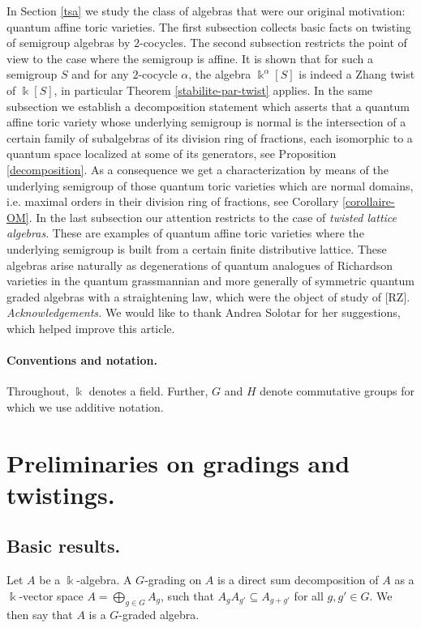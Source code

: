 \documentclass[twoside,11pt]{article}
\renewcommand{\k}{\Bbbk}
\begin{document}
In Section \ref{tsa} we study the class of algebras that were our original motivation:
quantum affine toric varieties. The first subsection collects basic
facts on twisting of semigroup algebras by $2$-cocycles. The second subsection restricts
the point of view to the case where the semigroup is affine. It is shown  that for such a
semigroup $S$ and for any $2$-cocycle $\alpha$, the algebra $\k^\alpha[S]$ is indeed a
Zhang twist of $\k[S]$, in particular Theorem \ref{stabilite-par-twist} applies. In the
same subsection we establish a decomposition statement which asserts that a quantum
affine toric variety whose underlying semigroup is normal is the intersection of a certain
family of subalgebras of its division ring of fractions, each isomorphic to a quantum
space localized at some of its generators, see Proposition \ref{decomposition}. As a
consequence we get a characterization by means of the underlying semigroup of those
quantum toric varieties which are normal domains, i.e. maximal orders in their division
ring of fractions, see Corollary \ref{corollaire-OM}. In the last subsection our
attention restricts to the case of \emph{twisted lattice algebras}. These are examples of
quantum affine toric varieties where the underlying semigroup is built from a certain
finite distributive lattice. These algebras arise naturally as degenerations of quantum
analogues of Richardson varieties in the quantum grassmannian and more generally of
symmetric quantum graded algebras with a straightening law, which were the object of study
of [RZ].\\


\noindent
{\em Acknowledgements.}
We would like to thank Andrea Solotar for her suggestions, which helped improve
this article.

\paragraph{Conventions and notation.} Throughout, $\k$ denotes a field. Further, $G$ and $H$ denote
commutative groups for which we use additive notation.

\section{Preliminaries on gradings and twistings.} \label{section-prelim}

\subsection{Basic results.} \label{ss-br} 
Let $A$ be a $\k$-algebra. A $G$-grading on $A$ is a direct sum decomposition of $A$ as a
$\k$-vector space $A=\bigoplus_{g\in G} A_g$, such that $A_g A_{g'} \subseteq A_{g+g'}$
for all $g, g' \in G$.  We then say that $A$ is a $G$-graded algebra.
\end{document}
